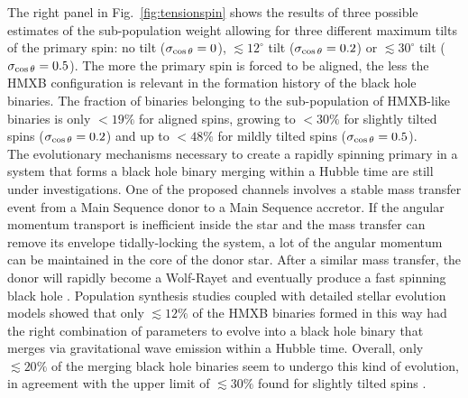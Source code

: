 \documentclass[a4paper,titlepage]{book}     	%
\begin{document}
The right panel in Fig.\ \ref{fig:tensionspin} shows the results of three possible estimates of the sub-population weight allowing for three different maximum tilts of the primary spin: no tilt ($\sigma_{\rm \cos \theta} = 0$), $\lesssim 12^{\circ}$ tilt ($\sigma_{\rm \cos \theta} = 0.2$) or $\lesssim 30^{\circ}$ tilt ($\sigma_{\rm \cos \theta} = 0.5$). The more the primary spin is forced to be aligned, the less the HMXB configuration is relevant in the formation history of the black hole binaries. The fraction of binaries belonging to the sub-population of HMXB-like binaries is only $< 19 \% $ for aligned spins, growing to $< 30 \%$ for slightly tilted spins ($\sigma_{\rm \cos \theta} = 0.2$) and up to $< 48 \%$ for mildly tilted spins ($\sigma_{\rm \cos \theta} = 0.5$).\\

The evolutionary mechanisms necessary to create a rapidly spinning primary in a system that forms a black hole binary merging within a Hubble time are still under investigations. One of the proposed channels involves a stable mass transfer event from a Main Sequence donor to a Main Sequence accretor. If the angular momentum transport is inefficient inside the star and the mass transfer can remove its envelope tidally-locking the system, a lot of the angular momentum can be maintained in the core of the donor star. After a similar mass transfer, the donor will rapidly become a Wolf-Rayet and eventually produce a fast spinning black hole \cite{spinfastBH_Qin2019}. Population synthesis studies coupled with detailed stellar evolution models showed that only $\lesssim 12 \%$ of the HMXB binaries formed in this way had the right combination of parameters to evolve into a black hole binary that merges via gravitational wave emission within a Hubble time. Overall, only $\lesssim 20 \%$ of the merging black hole binaries seem to undergo this kind of evolution, in agreement with the upper limit of $\lesssim 30 \%$ found for slightly tilted spins \cite{HMXBHspins2022}.



\end{document}
